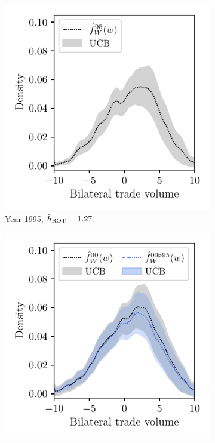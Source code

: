 \begin{figure}[ht]
  \centering
  \begin{subfigure}{0.32\textwidth}
    \centering
    \includegraphics[scale=0.64]{graphics/trade_plot_1995.pdf}
    \caption{Year 1995, $\hat h_{\operatorname{ROT}} = 1.27$.}
  \end{subfigure}
  \begin{subfigure}{0.32\textwidth}
    \centering
    \includegraphics[scale=0.64]{graphics/trade_plot_1995_2000.pdf}

\end{subfigure}
\end{figure}
